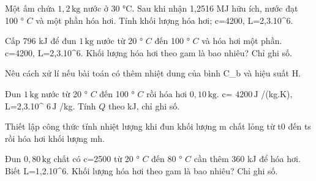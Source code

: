 \begin{bt}
Một ấm chứa $1,2\,\text{kg}$ nước ở 30 °C. Sau khi nhận 1,2516 MJ hữu ích, nước đạt 100 ° $C$ và một phần hóa hơi. Tính khối lượng hóa hơi; c=4200, L=2,3.10^6.
\end{bt}

\begin{ex}
Cấp 796 kJ để đun $1\,\text{kg}$ nước từ 20 ° $C$ đến 100 ° $C$ và hóa hơi một phần. c=4200, L=2,3.10^6. Khối lượng hóa hơi theo gam là bao nhiêu? Chỉ ghi số.
\end{ex}

\begin{bt}
Nêu cách xử lí nếu bài toán có thêm nhiệt dung của bình C_b và hiệu suất H.
\end{bt}

\begin{ex}
Đun $1\,\text{kg}$ nước từ 20 ° $C$ đến 100 ° $C$ rồi hóa hơi $0,10\,\text{kg}$. c= $4200\,\text{J}$ /(kg.K), L=2,3.10^ $6\,\text{J}$ /kg. Tính $Q$ theo kJ, chỉ ghi số.
\end{ex}

\begin{bt}
Thiết lập công thức tính nhiệt lượng khi đun khối lượng m chất lỏng từ t0 đến ts rồi hóa hơi khối lượng mh.
\end{bt}

\begin{ex}
Đun $0,80\,\text{kg}$ chất có c=2500 từ 20 ° $C$ đến 80 ° $C$ cần thêm 360 kJ để hóa hơi. Biết L=1,2.10^6. Khối lượng hóa hơi theo gam là bao nhiêu? Chỉ ghi số.
\end{ex}

